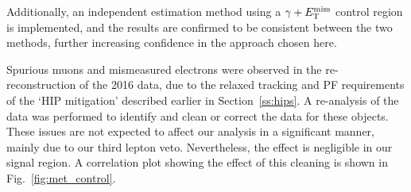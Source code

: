 Additionally, an independent estimation method using a $\gamma+E_\mathrm{T}^{\mathrm{miss}}$ control region is implemented, and the results are
confirmed to be consistent between the two methods, further increasing confidence in the approach chosen here.

Spurious muons and mismeasured electrons were observed in the re-reconstruction of the 2016 data, due to the relaxed tracking and PF requirements of the `HIP mitigation'
described earlier in Section~\ref{ss:hips}. 
A re-analysis of the data was performed to identify and clean or correct the data for these objects.
These issues are not expected to affect our analysis in a significant manner, mainly due to our third lepton veto.
Nevertheless, the effect is negligible in our signal region. 
A correlation plot showing the effect of this cleaning is shown in Fig.~\ref{fig:met_control}.

